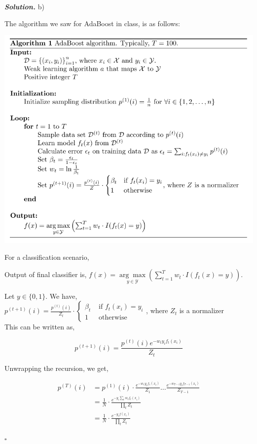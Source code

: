 \documentclass[12pt]{article}
\newenvironment{solution}[1][\it{Solution}]{\textbf{#1. } }{$\square$}
\begin{document}
\begin{solution}
b) 

The algorithm we saw for AdaBoost in class, is as follows:

\includegraphics[scale=0.6]{AdaBoost}


For a classification scenario,

Output of final classifier is, $f(x)=\underset{y \in \mathcal{Y}}{\arg \max }\left(\sum_{t=1}^{T} w_{t} \cdot I\left(f_{t}(x)=y\right)\right)$.


Let $y \in \{0, 1\}$. We have,\\

$
p^{(t+1)}(i)=\frac{p^{(t)}(i)}{Z_t} \cdot\left\{\begin{array}{ll}\beta_{t} & \text { if } f_{t}\left(x_{i}\right)=y_{i} \\ 1 & \text { otherwise }\end{array}\right.
$, where $Z_t$ is a normalizer
\\

This can be written as,

$$p^{(t+1)}(i)=\frac{p^{(t)}(i)e^{-w_ty_if_t\left(x_i\right)}}{Z_t}$$

Unwrapping the recursion, we get,

\begin{align*}
p^{(T)}(i) &= p^{(1)}(i) \cdot \frac{e^{-w_1y_if_1\left(x_i\right)}}{Z_1} \ldots \frac{e^{-w_{T-1}y_if_{T-1}\left(x_i\right)}}{Z_{T-1}}\\
			 &= \frac{1}{N} \cdot \frac{e^{-y_i \sum_t{w_tf_t\left(x_i\right)}}}{\prod_{t} Z_t}\\
			 &= \frac{1}{N} \cdot \frac{e^{-y_if(x_i) }}{\prod_{t} Z_t}
\end{align*}


\end{solution}
\end{document}
